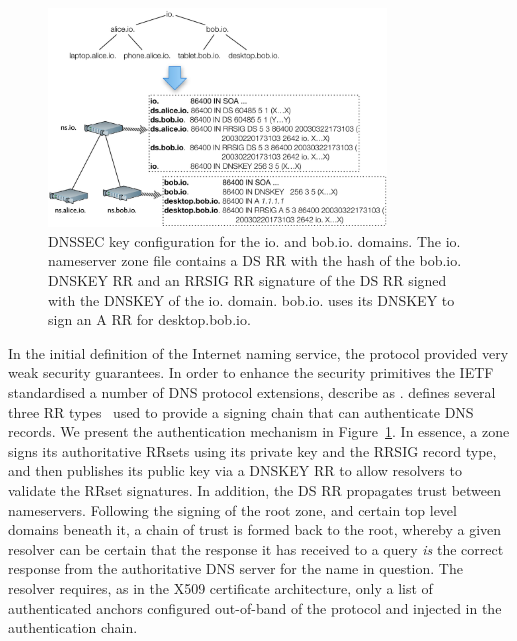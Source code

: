 \begin{figure}
  \centering
    \includegraphics[width=0.8\textwidth]{DNSSEC_hierarchy}
    \caption{DNSSEC key configuration for the io. and bob.io. domains. The io.
      nameserver zone file contains a DS RR with the hash of the bob.io. DNSKEY
      RR and an RRSIG RR signature of the DS RR signed with the DNSKEY of the
      io. domain. bob.io. uses its DNSKEY to sign an A RR for desktop.bob.io.}
  \label{fig:dnssec_hierarchy}
\end{figure}

In the initial definition of the Internet naming service, the protocol provided
very weak security guarantees. In order to enhance the security primitives the
IETF standardised a number of DNS protocol extensions, describe as \dnssec.
\dnssec defines several three RR types~\cite{RFC4034} used to provide a signing
chain that can authenticate DNS records.  We present the authentication
mechanism in Figure~\ref{fig:dnssec_hierarchy}. In essence, a zone signs its
authoritative RRsets using its private key and the RRSIG record type, and then
publishes its public key via a DNSKEY RR to allow resolvers to validate the
RRset signatures.  In addition, the DS RR propagates trust between nameservers.
Following the signing of the root zone, and certain top level domains beneath
it, a chain of trust is formed back to the root, whereby a given resolver can be
certain that the response it has received to a query \emph{is} the correct
response from the authoritative DNS server for the name in question. The
resolver requires, as in the X509 certificate architecture, only a list of
authenticated anchors configured out-of-band of the protocol and injected in the
authentication chain.

